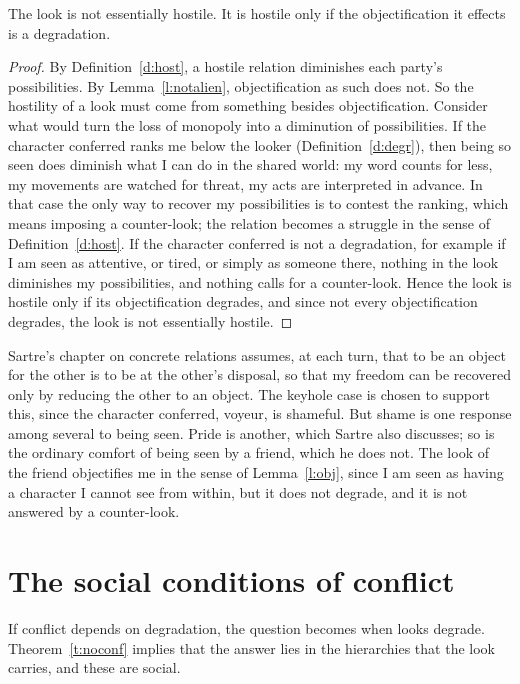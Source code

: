 \documentclass{situationist-preprint}
\begin{document}
\begin{theorem}\label{t:noconf}
The look is not essentially hostile. It is hostile only if the objectification it effects is a degradation.
\end{theorem}

\begin{proof}
By Definition~\ref{d:host}, a hostile relation diminishes each party's possibilities. By Lemma~\ref{l:notalien}, objectification as such does not. So the hostility of a look must come from something besides objectification. Consider what would turn the loss of monopoly into a diminution of possibilities. If the character conferred ranks me below the looker (Definition~\ref{d:degr}), then being so seen does diminish what I can do in the shared world: my word counts for less, my movements are watched for threat, my acts are interpreted in advance. In that case the only way to recover my possibilities is to contest the ranking, which means imposing a counter-look; the relation becomes a struggle in the sense of Definition~\ref{d:host}. If the character conferred is not a degradation, for example if I am seen as attentive, or tired, or simply as someone there, nothing in the look diminishes my possibilities, and nothing calls for a counter-look. Hence the look is hostile only if its objectification degrades, and since not every objectification degrades, the look is not essentially hostile.
\end{proof}

Sartre's chapter on concrete relations assumes, at each turn, that to be an object for the other is to be at the other's disposal, so that my freedom can be recovered only by reducing the other to an object. The keyhole case is chosen to support this, since the character conferred, voyeur, is shameful. But shame is one response among several to being seen. Pride is another, which Sartre also discusses; so is the ordinary comfort of being seen by a friend, which he does not. The look of the friend objectifies me in the sense of Lemma~\ref{l:obj}, since I am seen as having a character I cannot see from within, but it does not degrade, and it is not answered by a counter-look.

\section{The social conditions of conflict}

If conflict depends on degradation, the question becomes when looks degrade. Theorem~\ref{t:noconf} implies that the answer lies in the hierarchies that the look carries, and these are social.
\end{document}
